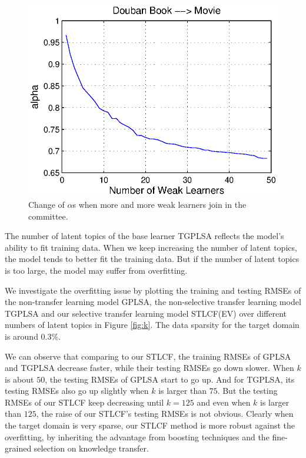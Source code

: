 \begin{figure}[t]
\centering
\includegraphics[width=6in]{fig/douban_alpha.eps}
\caption{Change of $\alpha$s when more and more weak learners join in the committee.}\label{fig:converge2}
\end{figure}

The number of latent topics of the base learner TGPLSA reflects the model's ability to fit training data. When we keep increasing the number of latent topics, the model tends to better fit the training data. But if the number of latent topics is too large, the model may suffer from overfitting.

We investigate the overfitting issue by plotting the training and testing RMSEs of the non-transfer learning model GPLSA, the non-selective transfer learning model TGPLSA and our selective transfer learning model STLCF(EV) over different numbers of latent topics in Figure \ref{fig:k}. The data sparsity for the target domain is around 0.3\%.

We can observe that comparing to our STLCF, the training RMSEs of GPLSA and TGPLSA decrease faster, while their testing RMSEs go down slower. When $k$ is about $50$, the testing RMSEs of GPLSA start to go up. And for TGPLSA, its testing RMSEs also go up slightly when $k$ is larger than $75$. But the testing RMSEs of our STLCF keep decreasing until $k=125$ and even when $k$ is larger than $125$, the raise of our STLCF's testing RMSEs is not obvious. Clearly when the target domain is very sparse, our STLCF method is more robust against the overfitting, by inheriting the advantage from boosting techniques and the fine-grained selection on knowledge transfer.

